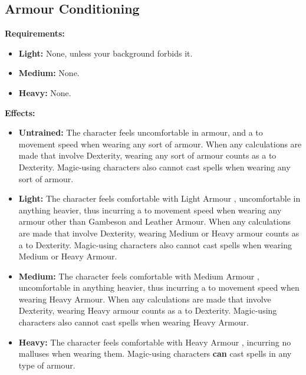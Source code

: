 \documentclass[openany,10pt,a4paper]{book}
\begin{document}
\subsection{Armour Conditioning}
\begin{table}[!ht]
\centering
{}
\end{table}
\textbf{Requirements:}
\begin{itemize}
	\item \textbf{Light:} None, unless your background forbids it.
	\item \textbf{Medium:} None.
	\item \textbf{Heavy:} None.
\end{itemize}
\textbf{Effects:}
\begin{itemize}
	\item \textbf{Untrained:} The character feels uncomfortable in armour, and a  to movement speed when wearing any sort of armour. When any calculations are made that involve Dexterity, wearing any sort of armour counts as a  to Dexterity. Magic-using characters also cannot cast spells when wearing any sort of armour.
	\item \textbf{Light:} The character feels comfortable with Light Armour , uncomfortable in anything heavier, thus incurring a  to movement speed when wearing any armour other than Gambeson and Leather Armour. When any calculations are made that involve Dexterity, wearing Medium or Heavy armour counts as a  to Dexterity. Magic-using characters also cannot cast spells when wearing Medium or Heavy Armour.
	\item \textbf{Medium:} The character feels comfortable with Medium Armour , uncomfortable in anything heavier, thus incurring a  to movement speed when wearing Heavy Armour. When any calculations are made that involve Dexterity, wearing Heavy armour counts as a  to Dexterity. Magic-using characters also cannot cast spells when wearing Heavy Armour.
	\item \textbf{Heavy:} The character feels comfortable with Heavy Armour , incurring no malluses when wearing them. Magic-using characters \textbf{can} cast spells in any type of armour.
\end{itemize}\newpage
\end{document}
